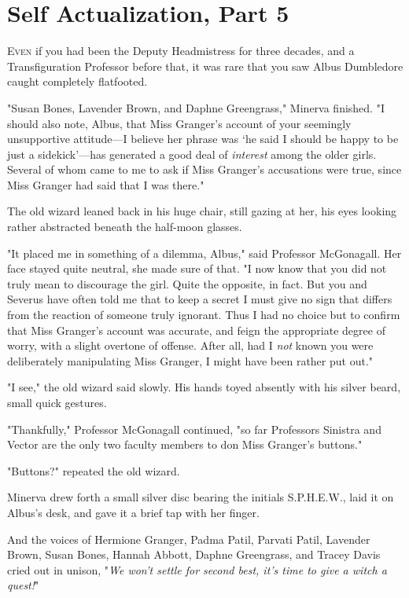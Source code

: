 \chapter{Self Actualization, Part 5}

\lettrine{E}{ven} if you had
been the Deputy Headmistress for three decades, and a Transfiguration Professor
before that, it was rare that you saw Albus Dumbledore caught completely
flatfooted.

"{\el}Susan Bones, Lavender Brown, and Daphne Greengrass," Minerva finished.
"I should also note, Albus, that Miss Granger's account of your seemingly
unsupportive attitude---I believe her phrase was `he said I should be happy to
be just a sidekick'---has generated a good deal of \emph{interest} among the
older girls. Several of whom came to me to ask if Miss Granger's accusations
were true, since Miss Granger had said that I was there."

The old wizard leaned back in his huge chair, still gazing at her, his eyes
looking rather abstracted beneath the half-moon glasses.

"It placed me in something of a dilemma, Albus," said Professor McGonagall. Her
face stayed quite neutral, she made sure of that. "I now know that you did not
truly mean to discourage the girl. Quite the opposite, in fact. But you and
Severus have often told me that to keep a secret I must give no sign that
differs from the reaction of someone truly ignorant. Thus I had no choice but
to confirm that Miss Granger's account was accurate, and feign the appropriate
degree of worry, with a slight overtone of offense. After all, had I \emph{not}
known you were deliberately manipulating Miss Granger, I might have been rather
put out."

"I{\el} see," the old wizard said slowly. His hands toyed absently with his
silver beard, small quick gestures.

"Thankfully," Professor McGonagall continued, "so far Professors Sinistra and
Vector are the only two faculty members to don Miss Granger's buttons."

"Buttons?" repeated the old wizard.

Minerva drew forth a small silver disc bearing the initials S.P.H.E.W., laid it
on Albus's desk, and gave it a brief tap with her finger.

And the voices of Hermione Granger, Padma Patil, Parvati Patil, Lavender Brown,
Susan Bones, Hannah Abbott, Daphne Greengrass, and Tracey Davis cried out in
unison, "\emph{We won't settle for second best, it's time to give a witch a
quest!}"

